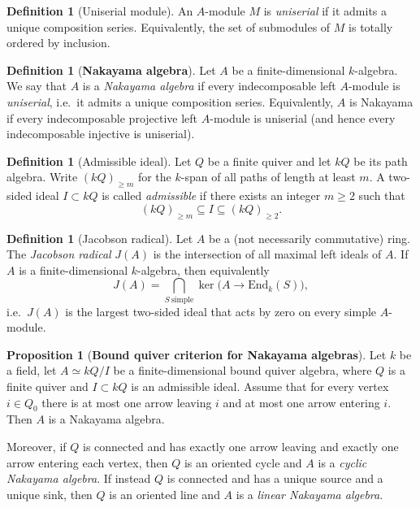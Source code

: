 \documentclass{article}
\theoremstyle{definition}
\newtheorem{proposition}[theorem]{Proposition}
\newtheorem{definition}[theorem]{Definition}
\begin{document}
\begin{definition}[Uniserial module]
An $A$-module $M$ is \emph{uniserial} if it admits a unique composition series. Equivalently, the set of submodules of $M$ is totally ordered by inclusion.
\end{definition}
\begin{definition}[\textbf{Nakayama algebra}]
Let $A$ be a finite-dimensional $k$-algebra. We say that $A$ is a \emph{Nakayama algebra} if every indecomposable left $A$-module is \emph{uniserial}, i.e.\ it admits a unique composition series.
Equivalently, $A$ is Nakayama if every indecomposable projective left $A$-module is uniserial (and hence every indecomposable injective is uniserial).
\end{definition}

\begin{definition}[Admissible ideal]
Let $Q$ be a finite quiver and let $kQ$ be its path algebra. Write $(kQ)_{\ge m}$ for the $k$-span of all paths of length at least $m$.
A two-sided ideal $I\subset kQ$ is called \emph{admissible} if there exists an integer $m\ge 2$ such that
\[
(kQ)_{\ge m}\subseteq I \subseteq (kQ)_{\ge 2}.
\]
\end{definition}

\begin{definition}[Jacobson radical]
Let $A$ be a (not necessarily commutative) ring. The \emph{Jacobson radical} $J(A)$ is the intersection of all maximal left ideals of $A$.
If $A$ is a finite-dimensional $k$-algebra, then equivalently
\[
J(A)=\bigcap_{S\ \text{simple}} \ker\big(A\to \mathrm{End}_k(S)\big),
\]
i.e.\ $J(A)$ is the largest two-sided ideal that acts by zero on every simple $A$-module.
\end{definition}

\begin{proposition}[\textbf{Bound quiver criterion for Nakayama algebras}]\label{prop:bound-quiver-nakayama}
Let $k$ be a field, let $A \simeq kQ/I$ be a finite-dimensional bound quiver algebra, where $Q$ is a finite quiver and
$I\subset kQ$ is an admissible ideal.
Assume that for every vertex $i\in Q_0$ there is at most one arrow leaving $i$ and at most one arrow entering $i$.
Then $A$ is a Nakayama algebra.

Moreover, if $Q$ is connected and has exactly one arrow leaving and exactly one arrow entering each vertex, then $Q$ is an oriented cycle and $A$ is a \emph{cyclic Nakayama algebra}. If instead $Q$ is connected and has a unique source and a unique sink, then $Q$ is an oriented line and $A$ is a \emph{linear Nakayama algebra}.
\end{proposition}
\end{document}
